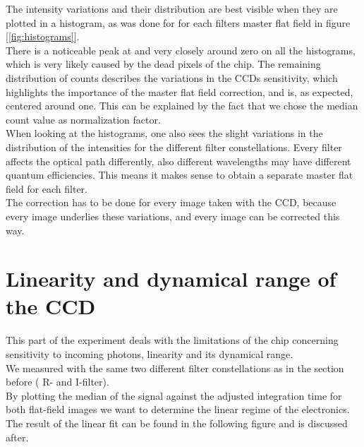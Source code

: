 The intensity variations and their distribution are best visible when they are plotted in a histogram, as was done for for each filters master flat field in figure
[\ref{fig:histograms}]. \\
There is a noticeable peak at and very closely around zero on all the histograms, which is very likely caused by the dead pixels of the chip.
The remaining distribution of counts describes the variations in the CCDs sensitivity, which highlights the importance of the master flat field correction, and is, as expected, centered around one. This can be explained by the fact that we chose the median count value as normalization factor. \\
When looking at the histograms, one also  sees the slight variations in the distribution of the intensities for the different filter constellations. 
Every filter affects the optical path differently, also different wavelengths may have different quantum efficiencies. 
This means it makes sense to obtain a separate master flat field for each filter.\\
The correction has to be done for every image taken with the CCD, because every image underlies these variations, and every image can be corrected this way.

\section{Linearity and dynamical range of the CCD}

This part of the experiment deals with the limitations of the chip concerning sensitivity to incoming photons, linearity and its dynamical range. \\
We measured with the same two different filter constellations  as in the section before ( R- and I-filter). \\
By plotting the median of the signal against the adjusted integration time for both flat-field images we want to determine the linear regime of the electronics. \\
The result of the linear fit can be found in the following figure and is discussed after.

